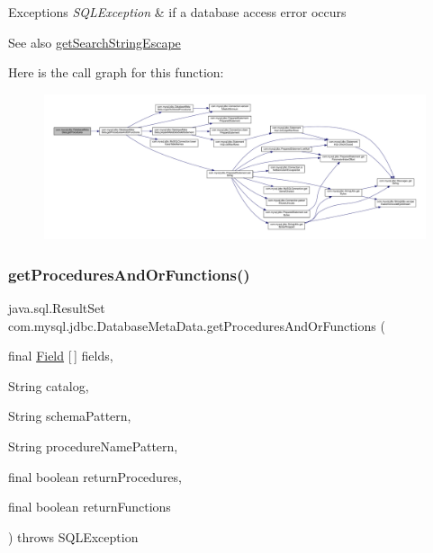 \begin{DoxyExceptions}{Exceptions}
{\em S\+Q\+L\+Exception} & if a database access error occurs \\
\hline
\end{DoxyExceptions}
\begin{DoxySeeAlso}{See also}
\mbox{\hyperlink{classcom_1_1mysql_1_1jdbc_1_1_database_meta_data_a210b7942557a965c3af550074bb6fe9d}{get\+Search\+String\+Escape}} 
\end{DoxySeeAlso}
Here is the call graph for this function\+:\nopagebreak
\begin{figure}[H]
\begin{center}
\leavevmode
\includegraphics[width=350pt]{classcom_1_1mysql_1_1jdbc_1_1_database_meta_data_a622efd6d2cc33569fba43123f4622843_cgraph}
\end{center}
\end{figure}
\mbox{\label{classcom_1_1mysql_1_1jdbc_1_1_database_meta_data_a677ceef89a15533d6f1aa37bb7074752}} 
\subsubsection{\texorpdfstring{get\+Procedures\+And\+Or\+Functions()}{getProceduresAndOrFunctions()}}
{\footnotesize\ttfamily java.\+sql.\+Result\+Set com.\+mysql.\+jdbc.\+Database\+Meta\+Data.\+get\+Procedures\+And\+Or\+Functions (\begin{DoxyParamCaption}\item[{final \mbox{\hyperlink{classcom_1_1mysql_1_1jdbc_1_1_field}{Field}} \mbox{[}$\,$\mbox{]}}]{fields,  }\item[{String}]{catalog,  }\item[{String}]{schema\+Pattern,  }\item[{String}]{procedure\+Name\+Pattern,  }\item[{final boolean}]{return\+Procedures,  }\item[{final boolean}]{return\+Functions }\end{DoxyParamCaption}) throws S\+Q\+L\+Exception\hspace{0.3cm}{\ttfamily [protected]}}


